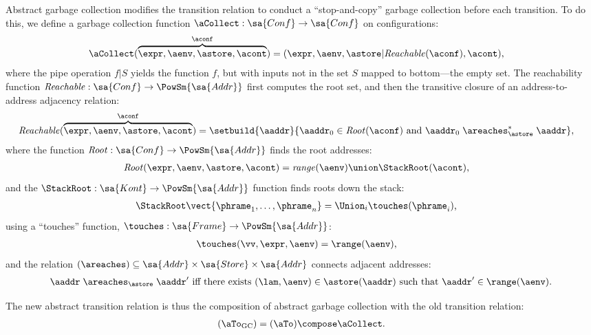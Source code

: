 Abstract garbage collection modifies the transition relation
to conduct a ``stop-and-copy'' garbage collection before each
transition.
To do this, we define a garbage collection function 
$\aCollect : \sa{Conf} \to \sa{Conf}$
on
configurations:
\begin{align*}
\aCollect(\overbrace{\expr,\aenv,\astore,\acont}^{\aconf})
&= (\expr,\aenv,\astore|\mathit{Reachable}(\aconf),\acont)
  \text,
  \end{align*}
  where the pipe operation $f|S$ yields the function $f$, but with
  inputs not in the set $S$ mapped to bottom---the empty set.
The reachability function $\mathit{Reachable} : \sa{Conf} \to \PowSm{\sa{Addr}}$
  first computes the root set, and then the transitive closure of an
  address-to-address adjacency relation: 
\begin{align*}
  \mathit{Reachable}(\overbrace{\expr,\aenv,\astore,\acont}^\aconf) &=
\setbuild{ \aaddr }{ \aaddr_0 \in \mathit{Root}(\aconf)
  \text{ and }
  \aaddr_0  
    \mathrel{\areaches_\astore^*}
  \aaddr
}
\text,
  \end{align*}
where the function $\mathit{Root} : \sa{Conf} \to 
  \PowSm{\sa{Addr}}$ 
  finds the root addresses:
  \begin{align*} 
  \mathit{Root}(\expr,\aenv,\astore,\acont) &=
  \mathit{range}(\aenv) \union
\StackRoot(\acont)
  \text,
  \end{align*}
  and the $\StackRoot : \sa{Kont} \to \PowSm{\sa{Addr}}$ function
  finds roots down the stack:
  \begin{align*} 
  \StackRoot
  \vect{\phrame_1,\ldots,\phrame_n}
  &= 
\Union_i \touches(\phrame_i)
  \text,
  \end{align*}
  using a ``touches'' function, $\touches : \sa{Frame} \to \PowSm{\sa{Addr}}$:
  \begin{align*}
    \touches(\vv,\expr,\aenv) &= \range(\aenv)
    \text,
  \end{align*}
  and the relation
  $(\areaches) \subseteq \sa{Addr} \times \sa{Store} \times \sa{Addr}$
  connects adjacent addresses:
  \begin{align*}
  \aaddr 
  \mathrel{\areaches_\astore} 
  \aaddr'
  \text{ iff there exists }
(\lam,\aenv) \in \astore(\aaddr)
  \text{ such that }
  \aaddr' \in \range(\aenv)
  \text.
  \end{align*}

The new abstract transition relation is thus the composition of abstract garbage collection with the old transition relation:
\begin{align*}
(\aTo_{\mathrm{GC}}) = 
(\aTo) \compose \aCollect\text.
\end{align*}


